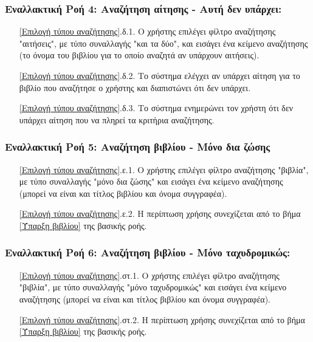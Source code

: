 \documentclass[12pt,a4paper]{article}
\begin{document}
\subsubsection*{Εναλλακτική Ροή 4: Αναζήτηση αίτησης - Αυτή δεν υπάρχει:}
\begin{enumerate}
    \item[\ref{Επιλογή τύπου αναζήτησης}.δ.1.] Ο χρήστης επιλέγει φίλτρο αναζήτησης "αιτήσεις", με τύπο συναλλαγής "και τα δύο", και εισάγει ένα κείμενο αναζήτησης (το όνομα του βιβλίου για το οποίο αναζητά αν υπάρχουν αιτήσεις).
    \item[\ref{Επιλογή τύπου αναζήτησης}.δ.2.] Το σύστημα ελέγχει αν υπάρχει αίτηση για το βιβλίο που αναζήτησε ο χρήστης και διαπιστώνει ότι δεν υπάρχει.
    \item[\ref{Επιλογή τύπου αναζήτησης}.δ.3.] Το σύστημα ενημερώνει τον χρήστη ότι δεν υπάρχει αίτηση που να πληρεί τα κριτήρια αναζήτησης.
\end{enumerate}

\subsubsection*{Εναλλακτική Ροή 5: Αναζήτηση βιβλίου - Μόνο δια ζώσης}
\begin{enumerate}
    \item[\ref{Επιλογή τύπου αναζήτησης}.ε.1.] Ο χρήστης επιλέγει φίλτρο αναζήτησης "βιβλία", με τύπο συναλλαγής "μόνο δια ζώσης" και εισάγει ένα κείμενο αναζήτησης (μπορεί να είναι και τίτλος βιβλίου και όνομα συγγραφέα).
    \item[\ref{Επιλογή τύπου αναζήτησης}.ε.2.] Η περίπτωση χρήσης συνεχίζεται από το βήμα \ref{Ύπαρξη βιβλίου} της βασικής ροής.
\end{enumerate}

\subsubsection*{Εναλλακτική Ροή 6: Αναζήτηση βιβλίου - Μόνο ταχυδρομικώς:}
\begin{enumerate}
    \item[\ref{Επιλογή τύπου αναζήτησης}.στ.1.] Ο χρήστης επιλέγει φίλτρο αναζήτησης "βιβλία", με τύπο συναλλαγής "μόνο ταχυδρομικώς" και εισάγει ένα κείμενο αναζήτησης (μπορεί να είναι και τίτλος βιβλίου και όνομα συγγραφέα).
    \item[\ref{Επιλογή τύπου αναζήτησης}.στ.2.] Η περίπτωση χρήσης συνεχίζεται από το βήμα \ref{Ύπαρξη βιβλίου} της βασικής ροής.
\end{enumerate}
\end{document}
